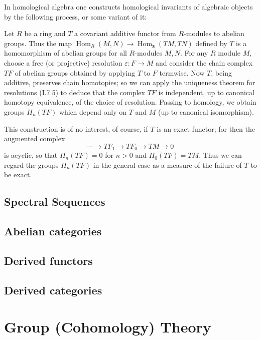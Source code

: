 \documentclass{book}
\begin{document}
In homological algebra one constructs homological invariants of algebraic objects by the following process, or some variant of it:

Let $R$ be a ring and $T$ a covariant additive functor from $R$-modules to abelian groups. Thus the map $\operatorname{Hom}_R(M, N) \rightarrow \operatorname{Hom}_{\mathbf{z}}(T M, T N)$ defined by $T$ is a homomorphism of abelian groups for all $R$-modules $M, N$. For any $R$ module $M$, choose a free (or projective) resolution $\varepsilon: F \rightarrow M$ and consider the chain complex $T F$ of abelian groups obtained by applying $T$ to $F$ termwise. Now $T$, being additive, preserves chain homotopies; so we can apply the uniqueness theorem for resolutions (I.7.5) to deduce that the complex $T F$ is independent, up to canonical homotopy equivalence, of the choice of resolution. Passing to homology, we obtain groups $H_n(T F)$ which depend only on $T$ and $M$ (up to canonical isomorphism).

This construction is of no interest, of course, if $T$ is an exact functor; for then the augmented complex
$$
\cdots \rightarrow T F_1 \rightarrow T F_0 \rightarrow T M \rightarrow 0
$$
is acyclic, so that $H_n(T F)=0$ for $n>0$ and $H_0(T F)=T M$. Thus we can regard the groups $H_n(T F)$ in the general case as a measure of the failure of $T$ to be exact.



\section{Spectral Sequences}




\section{Abelian categories}

\section{Derived functors}

\section{Derived categories}





\chapter{Group (Cohomology) Theory} 
\end{document}
